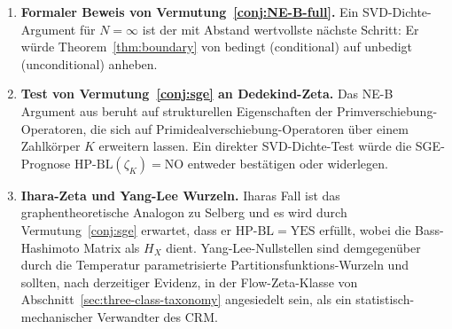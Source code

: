 \documentclass[11pt]{article}
\theoremstyle{definition}
\theoremstyle{remark}
\newcommand{\HBL}{\mathrm{HP\text{-}BL}}
\begin{document}
\begin{enumerate}
\item \textbf{Formaler Beweis von Vermutung~\ref{conj:NE-B-full}.} Ein
  SVD-Dichte-Argument für $N = \infty$ ist der mit Abstand wertvollste
  nächste Schritt: Er würde Theorem~\ref{thm:boundary} von
  bedingt (conditional) auf unbedigt (unconditional) anheben.
\item \textbf{Test von Vermutung~\ref{conj:sge} an Dedekind-Zeta.} Das
  NE-B Argument aus \cite{Geiger2026RHII} beruht auf strukturellen
  Eigenschaften der Primverschiebung-Operatoren, die sich auf
  Primidealverschiebung-Operatoren über einem Zahlkörper $K$ erweitern lassen. Ein direkter
  SVD-Dichte-Test würde die SGE-Prognose
  $\HBL(\zeta_K) = \mathrm{NO}$ entweder bestätigen oder widerlegen.
\item \textbf{Ihara-Zeta und Yang-Lee Wurzeln.} Iharas Fall ist das
  graphentheoretische Analogon zu Selberg und es wird durch
  Vermutung~\ref{conj:sge} erwartet, dass er $\HBL = \mathrm{YES}$ erfüllt, wobei
  die Bass-Hashimoto Matrix als $H_X$ dient. Yang-Lee-Nullstellen sind demgegenüber
  durch die Temperatur parametrisierte Partitionsfunktions-Wurzeln und sollten,
  nach derzeitiger Evidenz, in der Flow-Zeta-Klasse von
  Abschnitt~\ref{sec:three-class-taxonomy} angesiedelt sein, als ein
  statistisch-mechanischer Verwandter des CRM.


\end{enumerate}
\end{document}
